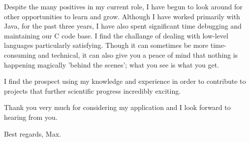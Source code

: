 \documentclass[11pt]{article}
\begin{document}
Despite the many positives in my current role, I have begun to look around for other opportunities to learn and grow. Although I have worked primarily with Java, for the past three years, I have also spent significant time debugging and maintaining our C code base. I find the challange of dealing with low-level languages particularly satisfying. Though it can sometimes be more time-consuming and technical, it can also give you a peace of mind that nothing is happening magically 'behind the scenes'; what you see is what you get. 

I find the prospect using my knowledge and experience in order to contribute to projects that further scientific progress incredibly exciting.

Thank you very much for considering my application and I look forward to hearing from you.

Best regards, Max.
\end{document}
